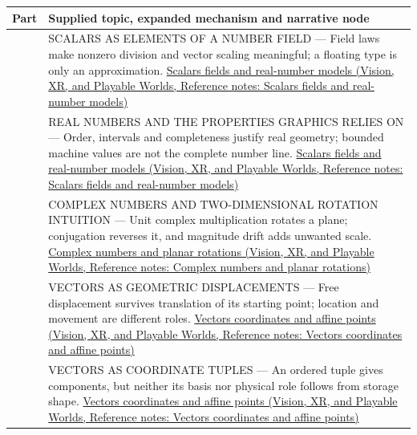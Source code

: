 {\def\LTcaptype{none} %
\begin{longtable}[]{@{}
  >{\raggedright\arraybackslash}p{}
  >{\raggedright\arraybackslash}p{}@{}}
\toprule\noalign{}
\begin{minipage}[b]{\linewidth}\raggedright
Part
\end{minipage} & \begin{minipage}[b]{\linewidth}\raggedright
Supplied topic, expanded mechanism and narrative node
\end{minipage} \\
\midrule\noalign{}
\endhead
\bottomrule\noalign{}
\endlastfoot
501 & SCALARS AS ELEMENTS OF A NUMBER FIELD --- Field laws make nonzero division and vector scaling meaningful; a floating type is only an approximation. \href{../07-Vision-XR-and-Playable-Worlds/main.pdf\#nameddest=appendix-52051ad550fe}{Scalars fields and real-number models (Vision, XR, and Playable Worlds, Reference notes: Scalars fields and real-number models)} \\
502 & REAL NUMBERS AND THE PROPERTIES GRAPHICS RELIES ON --- Order, intervals and completeness justify real geometry; bounded machine values are not the complete number line. \href{../07-Vision-XR-and-Playable-Worlds/main.pdf\#nameddest=appendix-52051ad550fe}{Scalars fields and real-number models (Vision, XR, and Playable Worlds, Reference notes: Scalars fields and real-number models)} \\
503 & COMPLEX NUMBERS AND TWO-DIMENSIONAL ROTATION INTUITION --- Unit complex multiplication rotates a plane; conjugation reverses it, and magnitude drift adds unwanted scale. \href{../07-Vision-XR-and-Playable-Worlds/main.pdf\#nameddest=appendix-f77eadcc4a93}{Complex numbers and planar rotations (Vision, XR, and Playable Worlds, Reference notes: Complex numbers and planar rotations)} \\
504 & VECTORS AS GEOMETRIC DISPLACEMENTS --- Free displacement survives translation of its starting point; location and movement are different roles. \href{../07-Vision-XR-and-Playable-Worlds/main.pdf\#nameddest=appendix-0659864c0aa3}{Vectors coordinates and affine points (Vision, XR, and Playable Worlds, Reference notes: Vectors coordinates and affine points)} \\
505 & VECTORS AS COORDINATE TUPLES --- An ordered tuple gives components, but neither its basis nor physical role follows from storage shape. \href{../07-Vision-XR-and-Playable-Worlds/main.pdf\#nameddest=appendix-0659864c0aa3}{Vectors coordinates and affine points (Vision, XR, and Playable Worlds, Reference notes: Vectors coordinates and affine points)} \\

\end{longtable}}
